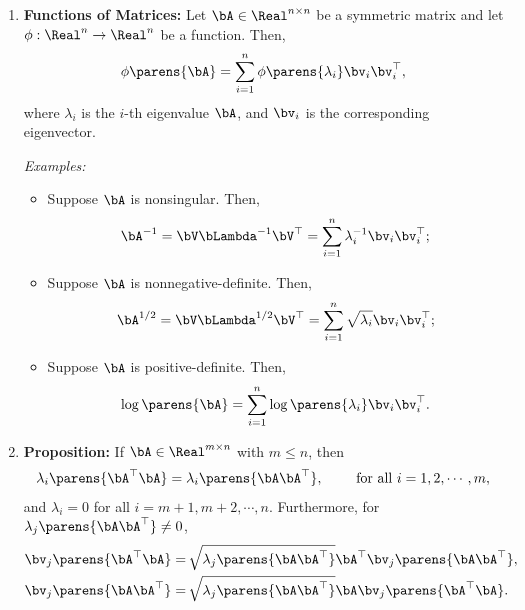 \documentclass[12pt]{article}
\begin{document}
\begin{enumerate}[label=\textbf{\arabic*.}]
	\item \textbf{Functions of Matrices:} Let $\bA \in \Real^{n \times n}$ be a symmetric matrix and let $\phi: \Real^n \to \Real^n$ be a function. Then, 
	\begin{align*}
		\phi \parens{\bA} = \sum_{i=1}^n \phi \parens{\lambda_i} \bv_i \bv_i^\top, 
	\end{align*}
	where $\lambda_i$ is the $i$-th eigenvalue $\bA$, and $\bv_i$ is the corresponding eigenvector. 
	
	\textit{Examples:}
	\begin{itemize}
		\item Suppose $\bA$ is nonsingular. Then, 
		\begin{align*}
			\bA^{-1} = \bV \bLambda^{-1} \bV^\top = \sum_{i=1}^n \lambda_i^{-1} \bv_i \bv_i^{\top}; 
		\end{align*}
		\item Suppose $\bA$ is nonnegative-definite. Then, 
		\begin{align*}
			\bA^{1/2} = \bV \bLambda^{1/2} \bV^\top = \sum_{i=1}^n \sqrt{\lambda_i} \bv_i \bv_i^{\top}; 
		\end{align*}
		\item Suppose $\bA$ is positive-definite. Then, 
		\begin{align*}
			\log \parens{\bA} = \sum_{i=1}^n \log \parens{\lambda_i} \bv_i \bv_i^{\top}. 
		\end{align*}
	\end{itemize}
	
	\item \textbf{Proposition:} If $\bA \in \Real^{m \times n}$ with $m \le n$, then
	\begin{align*}
		\lambda_i \parens{\bA^\top \bA} = \lambda_i \parens{\bA \bA^\top}, \hspace{20pt} \text{ for all } i = 1, 2, \cdots, m, 
	\end{align*}
	and $\lambda_i = 0$ for all $i = m+1, m+2, \cdots, n$. Furthermore, for $\lambda_j \parens{\bA \bA^\top} \ne 0$, 
	\begin{align*}
		\bv_j \parens{\bA^\top \bA} = & \, \sqrt{\lambda_j \parens{\bA \bA^\top}} \bA^\top \bv_j \parens{\bA \bA^\top}, \\
		\bv_j \parens{\bA \bA^\top} = & \, \sqrt{\lambda_j \parens{\bA \bA^\top}} \bA \bv_j \parens{\bA^\top \bA}. 
	\end{align*}
	

\end{enumerate}
\end{document}
